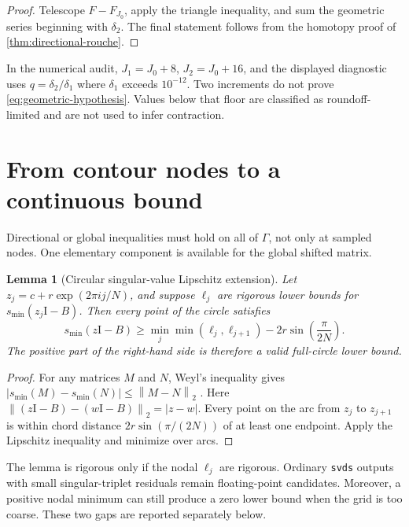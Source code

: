 \documentclass[11pt]{article}
\newtheorem{lemma}[theorem]{Lemma}
\theoremstyle{definition}
\theoremstyle{remark}
\newcommand{\Id}{\mathrm I}
\newcommand{\smin}{s_{\min}}
\newcommand{\norm}[1]{\left\lVert#1\right\rVert}
\begin{document}
\begin{proof}
Telescope \(F-F_{J_0}\), apply the triangle inequality, and sum the
geometric series beginning with \(\delta_2\).  The final statement follows
from the homotopy proof of \cref{thm:directional-rouche}.
\end{proof}

In the numerical audit, \(J_1=J_0+8\), \(J_2=J_0+16\), and the displayed
diagnostic uses \(q=\delta_2/\delta_1\) where \(\delta_1\) exceeds
\(10^{-12}\).  Two increments do not prove
\cref{eq:geometric-hypothesis}.  Values below that floor are classified as
roundoff-limited and are not used to infer contraction.

\section{From contour nodes to a continuous bound}
\label{sec:continuous}

Directional or global inequalities must hold on all of \(\Gamma\), not
only at sampled nodes.  One elementary component is available for the
global shifted matrix.

\begin{lemma}[Circular singular-value Lipschitz extension]
\label{lem:lipschitz}
Let \(z_j=c+r\exp(2\pi i j/N)\), and suppose \(\ell_j\) are rigorous lower
bounds for \(\smin(z_j\Id-B)\).  Then every point of the circle satisfies
\begin{equation}
 \smin(z\Id-B)\geq
 \min_j\min(\ell_j,\ell_{j+1})
 -2r\sin\!\left(\frac{\pi}{2N}\right).
 \label{eq:lipschitz-circle}
\end{equation}
The positive part of the right-hand side is therefore a valid full-circle
lower bound.
\end{lemma}

\begin{proof}
For any matrices \(M\) and \(N\), Weyl's inequality gives
\(|\smin(M)-\smin(N)|\leq\norm{M-N}_2\)
\citep{HornJohnson2013}.  Here
\(\norm{(z\Id-B)-(w\Id-B)}_2=|z-w|\).  Every point on the arc from
\(z_j\) to \(z_{j+1}\) is within chord distance
\(2r\sin(\pi/(2N))\) of at least one endpoint.  Apply the Lipschitz
inequality and minimize over arcs.
\end{proof}

The lemma is rigorous only if the nodal \(\ell_j\) are rigorous.  Ordinary
\texttt{svds} outputs with small singular-triplet residuals remain
floating-point candidates.  Moreover, a positive nodal minimum can still
produce a zero lower bound when the grid is too coarse.  These two gaps are
reported separately below.
\end{document}
